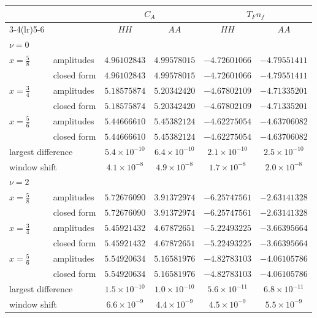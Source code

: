 \begin{table}[!htb]
\centering
\footnotesize
\setlength{\tabcolsep}{5pt}
\begin{tabular}{llcccc}
\toprule
& & \multicolumn{2}{c}{$C_A$} & \multicolumn{2}{c}{$T_Fn_f$}\\
\cmidrule(lr){3-4}\cmidrule(lr){5-6}
& & $HH$ & $AA$ & $HH$ & $AA$\\
\midrule
\multicolumn{6}{l}{$\nu=0$}\\
$x=\frac58$ & amplitudes & $4.96102843$ & $4.99578015$ & $-4.72601066$ & $-4.79551411$\\
 & closed form & $4.96102843$ & $4.99578015$ & $-4.72601066$ & $-4.79551411$\\
$x=\frac34$ & amplitudes & $5.18575874$ & $5.20342420$ & $-4.67802109$ & $-4.71335201$\\
 & closed form & $5.18575874$ & $5.20342420$ & $-4.67802109$ & $-4.71335201$\\
$x=\frac56$ & amplitudes & $5.44666610$ & $5.45382124$ & $-4.62275054$ & $-4.63706082$\\
 & closed form & $5.44666610$ & $5.45382124$ & $-4.62275054$ & $-4.63706082$\\
\multicolumn{2}{l}{largest difference} & $5.4\times10^{-10}$ & $6.4\times10^{-10}$ & $2.1\times10^{-10}$ & $2.5\times10^{-10}$\\
\multicolumn{2}{l}{window shift} & $4.1\times10^{-8}$ & $4.9\times10^{-8}$ & $1.7\times10^{-8}$ & $2.0\times10^{-8}$\\
\midrule
\multicolumn{6}{l}{$\nu=2$}\\
$x=\frac58$ & amplitudes & $5.72676090$ & $3.91372974$ & $-6.25747561$ & $-2.63141328$\\
 & closed form & $5.72676090$ & $3.91372974$ & $-6.25747561$ & $-2.63141328$\\
$x=\frac34$ & amplitudes & $5.45921432$ & $4.67872651$ & $-5.22493225$ & $-3.66395664$\\
 & closed form & $5.45921432$ & $4.67872651$ & $-5.22493225$ & $-3.66395664$\\
$x=\frac56$ & amplitudes & $5.54920634$ & $5.16581976$ & $-4.82783103$ & $-4.06105786$\\
 & closed form & $5.54920634$ & $5.16581976$ & $-4.82783103$ & $-4.06105786$\\
\multicolumn{2}{l}{largest difference} & $1.5\times10^{-10}$ & $1.0\times10^{-10}$ & $5.6\times10^{-11}$ & $6.8\times10^{-11}$\\
\multicolumn{2}{l}{window shift} & $6.6\times10^{-9}$ & $4.4\times10^{-9}$ & $4.5\times10^{-9}$ & $5.5\times10^{-9}$\\

\end{tabular}
\end{table}
